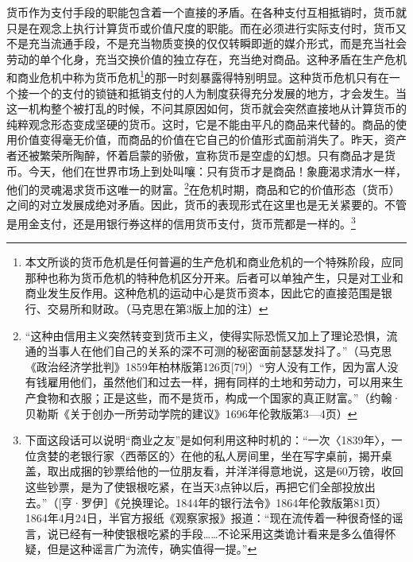 \documentclass{ctexbook}
\begin{document}
        货币作为支付手段的职能包含着一个直接的矛盾。在各种支付互相抵销时，货币就只是在观念上执行计算货币或价值尺度的职能。而在必须进行实际支付时，货币又不是充当流通手段，不是充当物质变换的仅仅转瞬即逝的媒介形式，而是充当社会劳动的单个化身，充当交换价值的独立存在，充当绝对商品。这种矛盾在生产危机和商业危机中称为货币危机\footnote{本文所谈的货币危机是任何普遍的生产危机和商业危机的一个特殊阶段，应同那种也称为货币危机的特种危机区分开来。后者可以单独产生，只是对工业和商业发生反作用。这种危机的运动中心是货币资本，因此它的直接范围是银行、交易所和财政。（马克思在第3版上加的注）}的那一时刻暴露得特别明显。这种货币危机只有在一个接一个的支付的锁链和抵销支付的人为制度获得充分发展的地方，才会发生。当这一机构整个被打乱的时候，不问其原因如何，货币就会突然直接地从计算货币的纯粹观念形态变成坚硬的货币。这时，它是不能由平凡的商品来代替的。商品的使用价值变得毫无价值，而商品的价值在它自己的价值形式面前消失了。昨天，资产者还被繁荣所陶醉，怀着启蒙的骄傲，宣称货币是空虚的幻想。只有商品才是货币。今天，他们在世界市场上到处叫嚷：只有货币才是商品！象鹿渴求清水一样，他们的灵魂渴求货币这唯一的财富。\footnote{“这种由信用主义突然转变到货币主义，使得实际恐慌又加上了理论恐惧，流通的当事人在他们自己的关系的深不可测的秘密面前瑟瑟发抖了。”（马克思《政治经济学批判》1859年柏林版第126页[79]）“穷人没有工作，因为富人没有钱雇用他们，虽然他们和过去一样，拥有同样的土地和劳动力，可以用来生产食物和衣服；正是这些，而不是货币，构成一个国家的真正财富。”（约翰·贝勒斯《关于创办一所劳动学院的建议》1696年伦敦版第3—4页）}在危机时期，商品和它的价值形态（货币）之间的对立发展成绝对矛盾。因此，货币的表现形式在这里也是无关紧要的。不管是用金支付，还是用银行券这样的信用货币支付，货币荒都是一样的。\footnote{下面这段话可以说明“商业之友”是如何利用这种时机的：“一次〈1839年〉，一位贪婪的老银行家〈西蒂区的〉在他的私人房间里，坐在写字桌前，揭开桌盖，取出成捆的钞票给他的一位朋友看，并洋洋得意地说，这是60万镑，收回这些钞票，是为了使银根吃紧，在当天3点钟以后，再把它们全部投放出去。”（[亨·罗伊］《兑换理论。1844年的银行法令》1864年伦敦版第81页）1864年4月24日，半官方报纸《观察家报》报道：“现在流传着一种很奇怪的谣言，说已经有一种使银根吃紧的手段……不论采用这类诡计看来是多么值得怀疑，但是这种谣言广为流传，确实值得一提。”}
\end{document}
